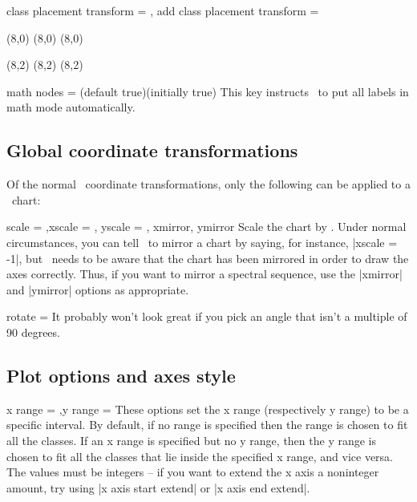 \begin{sseqdata}[name = basic, cohomological Serre grading]
\begin{keylist}{%
    class placement transform = ,%
    add class placement transform = %
}
\begin{codeexample}[width = 5.5cm]
\begin{sseqpage}
(8,0)
(8,0)
(8,0)

(8,2)
(8,2)
(8,2)
\end{sseqpage}
\end{codeexample}
\end{keylist}

\begin{key}{math nodes =  (default true)(initially true)}%
This key instructs \sseqpages\  to put all labels in math mode automatically.
\end{key}



\subsection{Global coordinate transformations}
Of the normal \tikzpkg\ coordinate transformations, only the following can be
applied to a \sseqpages\  chart:
\begin{keylist}{scale = ,xscale = , yscale = , xmirror, ymirror}%
Scale the chart by . Under normal circumstances, you can tell
\tikzpkg\ to mirror a chart by saying, for instance, |xscale = -1|, but
\sseqpages\  needs to be aware that the chart has been mirrored in order to draw
the axes correctly. Thus, if you want to mirror a spectral sequence, use the
|xmirror| and |ymirror| options as appropriate.
\end{keylist}

\begin{key}{rotate = }
It probably won't look great if you pick an angle that isn't a multiple of 90 degrees.
\end{key}

\subsection{Plot options and axes style}
\begin{keylist}{x range = ,y range = } These options set the x range (respectively y range) to be a specific
interval. By default, if no range is specified then the range is chosen to fit
all the classes. If an x range is specified but no y range, then the y range is
chosen to fit all the classes that lie inside the specified x range, and vice
versa. The values must be integers -- if you want to extend the x axis a
noninteger amount, try using |x axis start extend| or |x axis end extend|.
\end{keylist}


\end{sseqdata}
